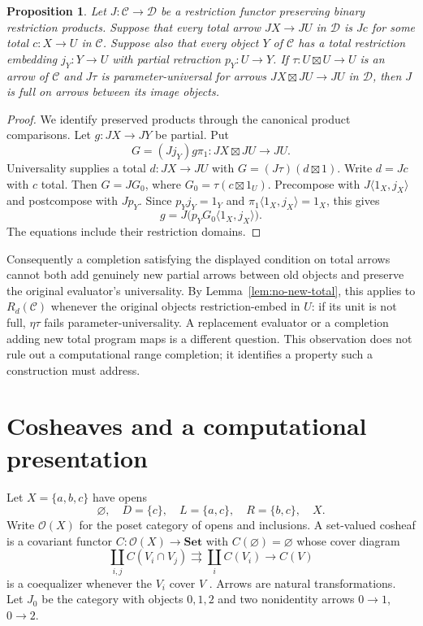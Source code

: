 \documentclass[11pt]{article}
\newtheorem{proposition}[theorem]{Proposition}
\newcommand{\Set}{\mathbf{Set}}
\newcommand{\C}{\mathscr C}
\begin{document}
\begin{proposition}\label{prop:evaluator-obstruction}
Let $J:\C\to\mathscr D$ be a restriction functor preserving binary
restriction products. Suppose that every total arrow
$JX\to JU$ in $\mathscr D$ is $Jc$ for some total $c:X\to U$ in
$\C$. Suppose also that every object $Y$ of $\C$ has a total
restriction embedding $j_Y:Y\to U$ with partial retraction
$p_Y:U\to Y$.
If $\tau:U\boxtimes U\to U$ is an arrow of $\C$ and
$J\tau$ is parameter-universal for arrows
$JX\boxtimes JU\to JU$ in $\mathscr D$, then $J$ is full on
arrows between its image objects.
\end{proposition}
\begin{proof}
We identify preserved products through the canonical product comparisons.
Let $g:JX\to JY$ be partial. Put
\[
 G=(Jj_Y)g\pi_1:JX\boxtimes JU\to JU.
\]
Universality supplies a total $d:JX\to JU$ with
$G=(J\tau)(d\boxtimes1)$. Write $d=Jc$ with $c$ total.
Then $G=JG_0$, where $G_0=\tau(c\boxtimes1_U)$.
Precompose with $J\langle1_X,j_X\rangle$ and postcompose with
$Jp_Y$. Since $p_Yj_Y=1_Y$ and
$\pi_1\langle1_X,j_X\rangle=1_X$, this gives
\[
 g=J\bigl(p_YG_0\langle1_X,j_X\rangle\bigr).
\]
The equations include their restriction domains.
\end{proof}

Consequently a completion satisfying the displayed condition on total
arrows cannot both add genuinely new partial arrows between old objects
and preserve the original evaluator's universality.
By Lemma~\ref{lem:no-new-total}, this applies to $R_d(\C)$ whenever
the original objects restriction-embed in $U$: if its unit is not full,
$\eta\tau$ fails parameter-universality.
A replacement
evaluator or a completion adding new total program maps is a different
question. This observation does not rule out a computational range
completion; it identifies a property such a construction must address.

\section{Cosheaves and a computational presentation}\label{sec:cosheaves}

Let $X=\{a,b,c\}$ have opens
\[
 \varnothing,\quad D=\{c\},\quad
 L=\{a,c\},\quad R=\{b,c\},\quad X.
\]
Write $\mathcal O(X)$ for the poset category of opens and inclusions.
A set-valued cosheaf is a covariant functor
$C:\mathcal O(X)\to\Set$ with $C(\varnothing)=\varnothing$
whose cover diagram
\[
 \coprod_{i,j}C(V_i\cap V_j)\rightrightarrows
 \coprod_iC(V_i)\longrightarrow C(V)
\]
is a coequalizer whenever the $V_i$ cover $V$
\cite[\S\S2.1--2.2]{Curry}. Arrows are natural transformations.
Let $J_0$ be the category with objects $0,1,2$ and two
nonidentity arrows $0\to1$, $0\to2$.
\end{document}
